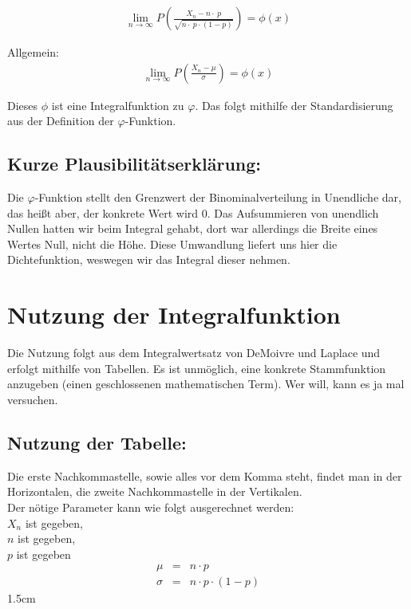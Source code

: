 \documentclass[12pt,a4paper,twocolumn]{article}
\begin{document}
\begin{eqnarray}
\lim\limits_{n \rightarrow \infty} P \left(\frac{X_n - n\cdot\ p}{\sqrt{n\cdot\ p\cdot(1 - p)}}\right) = \phi(x)
\end{eqnarray}

Allgemein:
\begin{eqnarray}
\lim\limits_{n \rightarrow \infty} P \left(\frac{X_n - \mu}{\sigma}\right) = \phi(x)
\end{eqnarray}

Dieses $\phi$ ist eine Integralfunktion zu $\varphi$. Das folgt mithilfe der Standardisierung aus der Definition der $\varphi$-Funktion. 

\subsection{Kurze Plausibilitätserklärung:}

Die $\varphi$-Funktion stellt den Grenzwert der Binominalverteilung in Unendliche dar, das heißt aber, der konkrete Wert wird 0. Das Aufsummieren von unendlich Nullen hatten wir beim Integral gehabt, dort war allerdings die Breite eines Wertes Null, nicht die \glqq Höhe\grqq. Diese Umwandlung liefert uns hier die Dichtefunktion, weswegen wir das Integral dieser nehmen.

\section{Nutzung der Integralfunktion}
Die Nutzung folgt aus dem Integralwertsatz von DeMoivre und Laplace und erfolgt mithilfe von Tabellen. Es ist unmöglich, eine konkrete Stammfunktion anzugeben (einen geschlossenen mathematischen Term). Wer will, kann es ja mal versuchen.
\subsection{Nutzung der Tabelle:}

Die erste Nachkommastelle, sowie alles vor dem Komma steht, findet man in der Horizontalen, die zweite Nachkommastelle in der Vertikalen. 
\\
Der nötige Parameter kann wie folgt ausgerechnet werden:\\
{\center $X_n$ ist gegeben,\\
$n$ ist gegeben,\\
$p$ ist gegeben\\}
\begin{eqnarray}
\mu &=& n \cdot p \\
\sigma &=& n \cdot p \cdot (1 - p)
\end{eqnarray}
\setlength{\fboxsep} {1.5cm}
\end{document}

